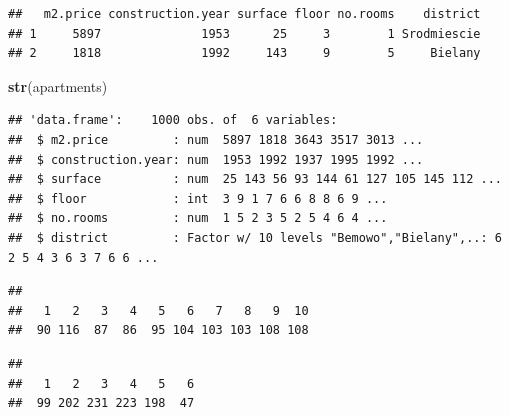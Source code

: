 \documentclass[12pt,]{krantz}
\newenvironment{Shaded}{\begin{snugshade}}{\end{snugshade}}
\newcommand{\KeywordTok}[1]{\textcolor[rgb]{0.13,0.29,0.53}{\textbf{#1}}}
\newcommand{\NormalTok}[1]{#1}
\newcommand{\OperatorTok}[1]{\textcolor[rgb]{0.81,0.36,0.00}{\textbf{#1}}}
\begin{document}
\begin{verbatim}
##   m2.price construction.year surface floor no.rooms    district
## 1     5897              1953      25     3        1 Srodmiescie
## 2     1818              1992     143     9        5     Bielany
\end{verbatim}

\begin{Shaded}
\begin{Highlighting}[]
\KeywordTok{str}\NormalTok{(apartments)}
\end{Highlighting}
\end{Shaded}

\begin{verbatim}
## 'data.frame':    1000 obs. of  6 variables:
##  $ m2.price         : num  5897 1818 3643 3517 3013 ...
##  $ construction.year: num  1953 1992 1937 1995 1992 ...
##  $ surface          : num  25 143 56 93 144 61 127 105 145 112 ...
##  $ floor            : int  3 9 1 7 6 6 8 8 6 9 ...
##  $ no.rooms         : num  1 5 2 3 5 2 5 4 6 4 ...
##  $ district         : Factor w/ 10 levels "Bemowo","Bielany",..: 6 2 5 4 3 6 3 7 6 6 ...
\end{verbatim}

\begin{Shaded}
\end{Shaded}

\begin{verbatim}
## 
##   1   2   3   4   5   6   7   8   9  10 
##  90 116  87  86  95 104 103 103 108 108
\end{verbatim}

\begin{Shaded}
\end{Shaded}

\begin{verbatim}
## 
##   1   2   3   4   5   6 
##  99 202 231 223 198  47
\end{verbatim}

\begin{Shaded}
\end{Shaded}
\end{document}

